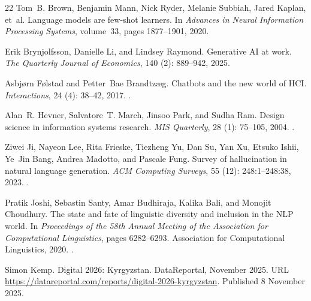 \begin{thebibliography}{22}
Tom~B. Brown, Benjamin Mann, Nick Ryder, Melanie Subbiah, Jared Kaplan, et~al.
\newblock Language models are few-shot learners.
\newblock In \emph{Advances in Neural Information Processing Systems},
  volume~33, pages 1877--1901, 2020.

Erik Brynjolfsson, Danielle Li, and Lindsey Raymond.
\newblock Generative {AI} at work.
\newblock \emph{The Quarterly Journal of Economics}, 140 (2):
  889--942, 2025.

Asbj{\o}rn F{\o}lstad and Petter~Bae Brandtz{\ae}g.
\newblock Chatbots and the new world of {HCI}.
\newblock \emph{Interactions}, 24 (4): 38--42, 2017.
\newblock {}.

Alan~R. Hevner, Salvatore~T. March, Jinsoo Park, and Sudha Ram.
\newblock Design science in information systems research.
\newblock \emph{MIS Quarterly}, 28 (1): 75--105, 2004.
\newblock {}.

Ziwei Ji, Nayeon Lee, Rita Frieske, Tiezheng Yu, Dan Su, Yan Xu, Etsuko Ishii,
  Ye~Jin Bang, Andrea Madotto, and Pascale Fung.
\newblock Survey of hallucination in natural language generation.
\newblock \emph{ACM Computing Surveys}, 55 (12):
  248:1--248:38, 2023.
\newblock {}.

Pratik Joshi, Sebastin Santy, Amar Budhiraja, Kalika Bali, and Monojit
  Choudhury.
\newblock The state and fate of linguistic diversity and inclusion in the {NLP}
  world.
\newblock In \emph{Proceedings of the 58th Annual Meeting of the Association
  for Computational Linguistics}, pages 6282--6293. Association for
  Computational Linguistics, 2020.
\newblock {}.

Simon Kemp.
\newblock Digital 2026: Kyrgyzstan.
\newblock DataReportal, November 2025.
\newblock URL \url{https://datareportal.com/reports/digital-2026-kyrgyzstan}.
\newblock Published 8 November 2025.


\end{thebibliography}
